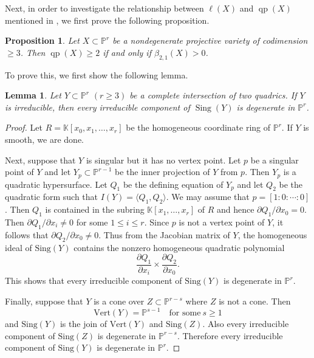 \documentclass[11pt,letterpaper,reqno]{amsart}
\theoremstyle{plain}
\newtheorem{lemma}[theorem]{Lemma}
\newtheorem{proposition}[theorem]{Proposition}
\theoremstyle{definition}
\newtheorem{open problem}[theorem]{Open Problem}
\newtheorem{remark and notation}[theorem]{Remark and Notation}
\newtheorem{remark and definition}[theorem]{Remark and Definition}
\newtheorem{definition and notation}[theorem]{Definition and Notation}
\newtheorem{notation and convention}[theorem]{Notation and Convention}
\newtheorem{notation and remark}[theorem]{Notation and Remark}
\newtheorem{convention and notation}[theorem]{Convention and Notation}
\def \p {\mathbb{P}}
\def \qp {\operatorname{qp}}
\def \Sing {\operatorname{Sing}}
\begin{document}
Next, in order to investigate the relationship between $\ell (X)$ and $\qp(X)$ mentioned in , we first prove the following proposition.

\begin{proposition}\label{prop:qp(X) bigger than 2}
Let $X \subset \p^r$ be a nondegenerate projective variety of codimension $\geq 3$. Then $\qp (X) \geq 2$ if and only if $\beta_{2,1} (X) > 0$.
\end{proposition}

To prove this, we first show the following lemma.

\begin{lemma}\label{lem:degeneracy singular locus}
Let $Y \subset \p^r$ $(r \geq 3)$ be a complete intersection of two quadrics. 
If $Y$ is irreducible, then every irreducible component of $\Sing (Y)$ is degenerate in $\p^r$.
\end{lemma}

\begin{proof}
Let $R = \mathbb{K} [x_0 , x_1 , \ldots , x_r ]$ be the homogeneous coordinate ring of $\p^r$. If $Y$ is smooth, we are done.

Next, suppose that $Y$ is singular but it has no vertex point. 
Let $p$ be a singular point of $Y$ and let $Y_p \subset \p^{r-1}$ be the inner projection of $Y$ from $p$. 
Then $Y_p$ is a quadratic hypersurface. Let $Q_1$ be the defining equation of $Y_p$ and let $Q_2$ be the quadratic form such that $I(Y) = \langle Q_1 , Q_2 \rangle$. 
We may assume that $p = [1:0:\cdots:0]$. 
Then $Q_1$ is contained in the subring $\mathbb{K} [x_1 , \ldots , x_r ]$ of $R$ and hence $\partial{Q_1}/\partial{x_0} = 0$. Then $\partial{Q_1}/\partial{x_i} \neq 0$ for some $1 \leq i \leq r$. 
Since $p$ is not a vertex point of $Y$, it follows that $\partial{Q_2}/\partial{x_0} \neq 0$. 
Thus from the Jacobian matrix of $Y$, the homogeneous ideal of $\mbox{Sing} (Y)$ contains the nonzero homogeneous quadratic polynomial
$$\frac{\partial{Q_1}}{\partial{x_i}} \times \frac{\partial{Q_2}}{\partial{x_0}} .$$
This shows that every irreducible component of $\mbox{Sing} (Y)$ is degenerate in $\p^r$.

Finally, suppose that $Y$ is a cone over $Z \subset \p^{r-s}$ where $Z$ is not a cone. Then
$$\mbox{Vert}(Y) = \p^{s-1} \quad \mbox{for some}\ s \geq 1$$
and $\mbox{Sing} (Y)$ is the join of $\mbox{Vert}(Y)$ and $\mbox{Sing} (Z)$. Also every irreducible component of $\mbox{Sing} (Z)$ is degenerate in $\p^{r-s}$. Therefore every irreducible component of $\mbox{Sing} (Y)$ is degenerate in $\p^r$.
\end{proof}
\end{document}
